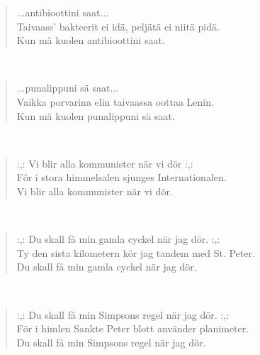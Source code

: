 \noindent\begin{minipage}{\linewidth}
\begin{verse}
	...antibioottini saat...\\
	Taivaass' bakteerit ei idä, peljätä ei niitä pidä.\\
	Kun mä kuolen antibioottini saat.\\
\end{verse}
\end{minipage}\\[10pt]
\noindent\begin{minipage}{\linewidth}
\begin{verse}
	...punalippuni sä saat...\\
	Vaikka porvarina elin taivaassa oottaa Lenin.\\
	Kun mä kuolen punalippuni sä saat.\\
\end{verse}
\end{minipage}\\[10pt]
\noindent\begin{minipage}{\linewidth}
\begin{verse}
	\hspace{0pt-\widthof{:,: }}:,: Vi blir alla kommunister när vi dör :,:\\
	För i stora himmelsalen sjunges Internationalen.\\
	Vi blir alla kommunister när vi dör.\\
\end{verse}
\end{minipage}\\[10pt]
\noindent\begin{minipage}{\linewidth}
\begin{verse}
	\hspace{0pt-\widthof{:,: }}:,: Du skall få min gamla cyckel när jag dör. :,:\\
	Ty den sista kilometern kör jag tandem med St. Peter.\\
	Du skall få min gamla cyckel när jag dör.\\
\end{verse}
\end{minipage}\\[10pt]
\noindent\begin{minipage}{\linewidth}
\begin{verse}
	\hspace{0pt-\widthof{:,: }}:,: Du skall få min Simpsons regel när jag dör. :,:\\
	För i himlen Sankte Peter blott använder planimeter.\\
	Du skall få min Simpsons regel när jag dör.\\
\end{verse}
\end{minipage}\\[10pt]
